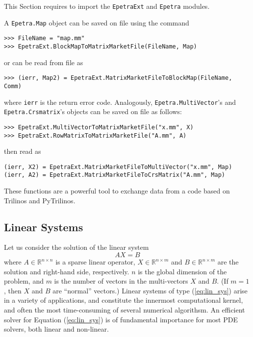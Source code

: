 \documentclass[10pt,relax]{SANDreport}
\begin{document}
This Section requires to import the {\tt EpetraExt} and {\tt Epetra} modules.

A {\tt Epetra.Map} object can be saved on file using the command
\begin{verbatim}
>>> FileName = "map.mm"
>>> EpetraExt.BlockMapToMatrixMarketFile(FileName, Map)
\end{verbatim}
or can be read from file as
\begin{verbatim}
>>> (ierr, Map2) = EpetraExt.MatrixMarketFileToBlockMap(FileName, Comm)
\end{verbatim}
where \verb!ierr! is the return error code. Analogously, 
\verb!Epetra.MultiVector!'s and \verb!Epetra.Crsmatrix!'s objects
can be saved on file as follows:
\begin{verbatim}
>>> EpetraExt.MultiVectorToMatrixMarketFile("x.mm", X)
>>> EpetraExt.RowMatrixToMatrixMarketFile("A.mm", A)
\end{verbatim}
then read as
\begin{verbatim}
(ierr, X2) = EpetraExt.MatrixMarketFileToMultiVector("x.mm", Map)
(ierr, A2) = EpetraExt.MatrixMarketFileToCrsMatrix("A.mm", Map)
\end{verbatim}
These functions are a powerful tool to exchange data from a code based on
Trilinos and PyTrilinos.

\subsection{Linear Systems}
\label{sec:linear}

Let us consider the solution of the linear system
\begin{equation}
\label{eq:lin_sys}
A X = B
\end{equation}
where $A \in \mathbb{R}^{n \times n}$ is a sparse linear operator, $X \in
\mathbb{R}^{n \times m}$ and $B \in \mathbb{R}^{n \times m}$ are the solution
and right-hand side, respectively. $n$ is the global dimension of the problem,
  and $m$ is the number of vectors in the multi-vectors $X$ and $B$. 
  (If $m = 1$, then $X$ and $B$ are ``normal'' vectors.)
Linear systems of type (\ref{eq:lin_sys}) arise in a variety of applications,
  and constitute the innermost computational kernel, and often the most
  time-consuming of several numerical algorithsm. An efficient solver for
  Equation (\ref{eq:lin_sys}) is of fundamental importance for most PDE
  solvers, both linear and non-linear.
\end{document}
